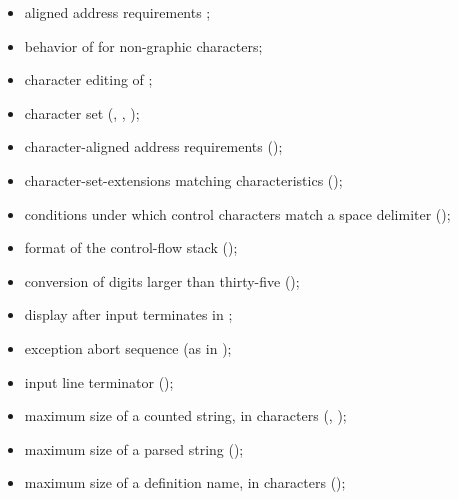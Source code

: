\begin{itemize}
\item aligned address requirements ;

\item behavior of  for non-graphic characters;

\item character editing of 
	;

\item character set (,
	, );

\item character-aligned address requirements
	();

\item character-set-extensions matching characteristics
	();

\item conditions under which control characters match a space
	delimiter ();

\item format of the control-flow stack
	();

\item conversion of digits larger than thirty-five
	();

\item display after input terminates in 
	;

\item exception abort sequence (as in );

\item input line terminator ();

\item maximum size of a counted string, in characters
	(, );

\item maximum size of a parsed string
	();

\item maximum size of a definition name, in characters
	();


\end{itemize}

